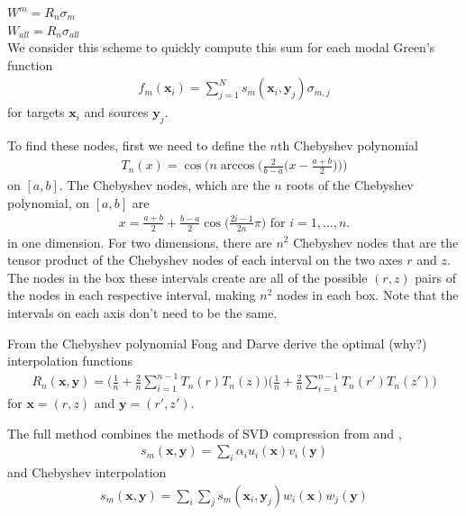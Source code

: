 \documentclass[11pt, oneside]{article}   	%
\begin{document}
$W^m=R_n \sigma_m$\\

$W_{all} = R_n \sigma_{all}$\\

We consider this scheme to quickly compute this sum for each modal Green's function
\begin{align}
f_m(\mathbf{x}_i)=\sum_{j=1}^N s_m(\mathbf{x}_i,\mathbf{y}_j)\sigma_{m,j}
\end{align}
for targets $\mathbf{x}_i$ and sources $\mathbf{y}_j$.

To find these nodes, first we need to define the $n$th Chebyshev polynomial
\begin{align}
T_n(x)=\cos\bigg(n\arccos\bigg(\frac{2}{b-a}\bigg(x-\frac{a+b}{2}\bigg)\bigg)\bigg)
\end{align}
on $[a,b]$. The Chebyshev nodes, which are the $n$ roots of the Chebyshev polynomial, on $[a,b]$ are
\begin{align}
x=\frac{a+b}{2}+\frac{b-a}{2}\cos\bigg(\frac{2i-1}{2n}\pi\bigg)\mbox{ for }i=1,\dots,n.
\end{align}
in one dimension. For two dimensions, there are $n^2$ Chebyshev nodes that are the tensor product of the Chebyshev nodes of each interval on the two axes $r$ and $z$. The nodes in the box these intervals create are all of the possible $(r,z)$ pairs of the nodes in each respective interval, making $n^2$ nodes in each box. Note that the intervals on each axis don't need to be the same.

From the Chebyshev polynomial Fong and Darve derive the optimal (why?) interpolation functions
\begin{align}
R_n(\mathbf{x},\mathbf{y}) = \bigg(\frac{1}{n} + \frac{2}{n}\sum_{i=1}^{n-1}T_n(r)T_n(z)\bigg)\bigg(\frac{1}{n} + \frac{2}{n}\sum_{i=1}^{n-1}T_n(r')T_n(z')\bigg)
\end{align}
for $\mathbf{x}=(r,z)$ and $\mathbf{y}=(r',z')$.

The full method combines the methods of SVD compression from \cite{ZGR} and \cite{MR},
\begin{align}
s_m(\mathbf{x},\mathbf{y})=\sum_i \alpha_i u_i(\mathbf{x})v_i(\mathbf{y})
\end{align}
and Chebyshev interpolation
\begin{align}
s_m(\mathbf{x},\mathbf{y})=\sum_i\sum_j s_m(\mathbf{x}_i,\mathbf{y}_j)w_i(\mathbf{x})w_j(\mathbf{y})
\end{align}
\end{document}
